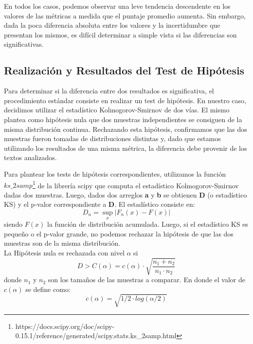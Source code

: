 \documentclass[12pt,journal,compsoc]{IEEEtran}
\begin{document}
En todos los casos, podemos observar una leve tendencia descendente en los valores de las métricas a medida que el puntaje promedio aumenta. Sin embargo, dada la poca diferencia absoluta entre los valores y la incertidumbre que presentan los mismos, es difícil determinar a simple vista si las diferencias son significativas.

\subsection{Realización y Resultados del Test de Hipótesis}


Para determinar si la diferencia entre dos resultados es significativa, el procedimiento estándar consiste en realizar un test de hipótesis. En nuestro caso, decidimos utilizar el estadístico Kolmogorov-Smirnov de dos vías. El mismo plantea como hipótesis nula que dos muestras independientes se consiguen de la misma distribución continua. Rechazando esta hipótesis, confirmamos que las dos muestras fueron tomadas de distribuciones distintas y, dado que estamos utilizando los resultados de una misma métrica, la diferencia debe provenir de los textos analizados.

Para plantear los tests de hipótesis correspondientes, utilizamos la función $ks\_2samp$\footnote{https://docs.scipy.org/doc/scipy-0.15.1/reference/generated/scipy.stats.ks\_2samp.html} de la librería scipy que computa el estadístico Kolmogorov-Smirnov dadas dos muestras. Luego, dados dos arreglos \textbf{a} y \textbf{b} se obtienen \textbf{D} (o estadístico KS) y el p-valor correspondiente a \textbf{D}. El estadístico consiste en:
$$D_{n}=\sup_{x}|F_{n}(x)-F(x)|$$
siendo $F(x)$ la función de distribución acumulada. Luego, si el estadístico KS es pequeño o el p-valor grande, no podemos rechazar la hipótesis de que las dos muestras son de la misma distribución\cite{degroot}.\\

La Hipótesis nula es rechazada con nivel $\alpha$ si $$D > C(\alpha) = c(\alpha) \cdot \sqrt{\frac{n_1+n_2}{n_1\cdot n_2}}$$ donde $n_1$ y $n_2$ son los tamaños de las muestras a comparar. En donde el valor de $c(\alpha)$ se define como:
$$c(\alpha) = \sqrt{1/2\cdot log(\alpha/2)}$$
\end{document}
